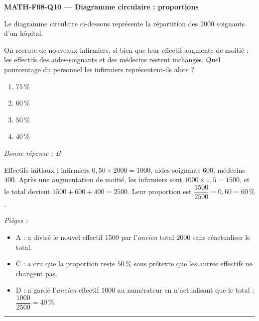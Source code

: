 \documentclass[11pt,a4paper]{article}
\begin{document}
\noindent\textbf{MATH-F08-Q10 --- Diagramme circulaire : proportions}\par
Le diagramme circulaire ci-dessous représente la répartition des $2000$ soignants d'un hôpital.
\begin{center}
\end{center}
On recrute de nouveaux infirmiers, si bien que leur effectif augmente de moitié ; les effectifs des aides-soignants et des médecins restent inchangés. Quel pourcentage du personnel les infirmiers représentent-ils alors ?
\begin{enumerate}[label=\Alph*)]
\item $75\,\%$
\item $60\,\%$
\item $50\,\%$
\item $40\,\%$
\end{enumerate}
\textit{Bonne réponse : B}\par
Effectifs initiaux : infirmiers $0{,}50\times2000=1000$, aides-soignants $600$, médecins $400$. Après une augmentation de moitié, les infirmiers sont $1000\times1{,}5=1500$, et le total devient $1500+600+400=2500$. Leur proportion est $\dfrac{1500}{2500}=0{,}60=60\,\%$.\par
\textit{Pièges :}
\begin{itemize}
\item A : a divisé le nouvel effectif $1500$ par l'\emph{ancien} total $2000$ sans réactualiser le total.
\item C : a cru que la proportion reste $50\,\%$ sous prétexte que les autres effectifs ne changent pas.
\item D : a gardé l'\emph{ancien} effectif $1000$ au numérateur en n'actualisant que le total : $\dfrac{1000}{2500}=40\,\%$.
\end{itemize}
\vspace{8pt}\hrule\vspace{8pt}
\end{document}
